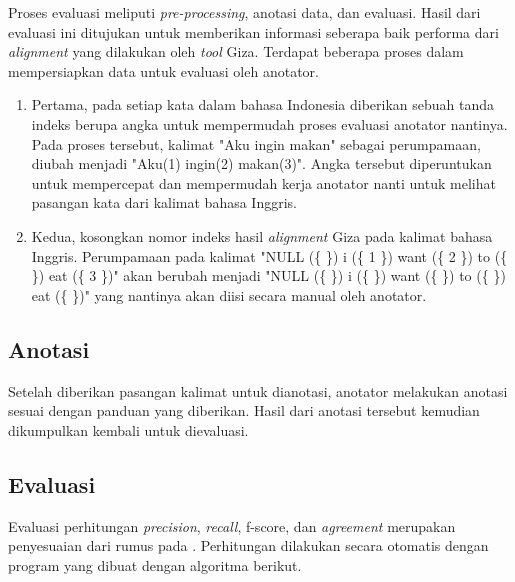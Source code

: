 Proses evaluasi meliputi \textit{pre-processing}, anotasi data, dan evaluasi. Hasil dari evaluasi ini ditujukan untuk memberikan informasi seberapa baik performa dari \textit{alignment} yang dilakukan oleh \textit{tool} Giza. Terdapat beberapa proses dalam mempersiapkan data untuk evaluasi oleh anotator.
\begin{enumerate}
	\item Pertama, pada setiap kata dalam bahasa Indonesia diberikan sebuah tanda indeks berupa angka untuk mempermudah proses evaluasi anotator nantinya. Pada proses tersebut, kalimat "Aku ingin makan" sebagai perumpamaan, diubah menjadi "Aku(1) ingin(2) makan(3)". Angka tersebut diperuntukan untuk mempercepat dan mempermudah kerja anotator nanti untuk melihat pasangan kata dari kalimat bahasa Inggris.
	\item Kedua, kosongkan nomor indeks hasil \textit{alignment} Giza pada kalimat bahasa Inggris. Perumpamaan pada kalimat "NULL (\{  \}) i (\{ 1 \}) want (\{ 2 \}) to (\{  \}) eat (\{ 3 \})" akan berubah menjadi  "NULL (\{  \}) i (\{  \}) want (\{   \}) to (\{  \}) eat (\{  \})" yang nantinya akan diisi secara manual oleh anotator.
\end{enumerate}

\subsection{Anotasi}
Setelah diberikan pasangan kalimat untuk dianotasi, anotator melakukan anotasi sesuai dengan panduan yang diberikan. Hasil dari anotasi tersebut kemudian dikumpulkan kembali untuk dievaluasi.

\subsection{Evaluasi}
Evaluasi perhitungan \textit{precision}, \textit{recall}, f-score, dan \textit{agreement} merupakan penyesuaian dari rumus pada \citep{mihalcea2003evaluation}. Perhitungan dilakukan secara otomatis dengan program yang dibuat dengan algoritma berikut.

